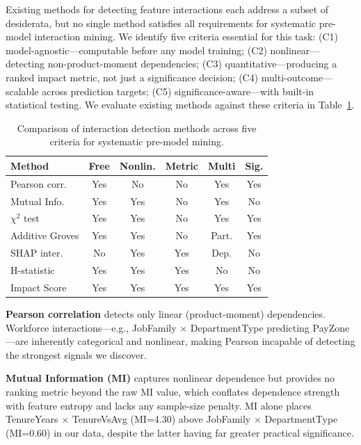 \documentclass[conference]{IEEEtran}
\begin{document}
Existing methods for detecting feature interactions each address a subset of desiderata, but no single method satisfies all requirements for systematic pre-model interaction mining. We identify five criteria essential for this task: (C1) model-agnostic---computable before any model training; (C2) nonlinear---detecting non-product-moment dependencies; (C3) quantitative---producing a ranked impact metric, not just a significance decision; (C4) multi-outcome---scalable across prediction targets; (C5) significance-aware---with built-in statistical testing. We evaluate existing methods against these criteria in Table~\ref{tab:method_comparison}.

\begin{table}[htb]
\centering
\small
\renewcommand{\arraystretch}{1.15}
\caption{Comparison of interaction detection methods across five criteria for systematic pre-model mining.}
\label{tab:method_comparison}
\begin{tabular}{lccccc}
\hline
Method & Free & Nonlin. & Metric & Multi & Sig. \\
\hline
Pearson corr. & Yes & No & No & Yes & Yes \\
Mutual Info. & Yes & Yes & No & Yes & No \\
$\chi^2$ test & Yes & Yes & No & Yes & Yes \\
Additive Groves \cite{sorokina2008detecting} & Yes & Yes & No & Part. & Yes \\
SHAP inter. \cite{lundberg2020shap} & No & Yes & Yes & Dep. & No \\
H-statistic \cite{friedman2008predictive} & Yes & Yes & Yes & No & No \\
Impact Score & Yes & Yes & Yes & Yes & Yes \\
\hline
\end{tabular}
\end{table}

\noindent\textbf{Pearson correlation} detects only linear (product-moment) dependencies. Workforce interactions---e.g., JobFamily $\times$ DepartmentType predicting PayZone---are inherently categorical and nonlinear, making Pearson incapable of detecting the strongest signals we discover.

\textbf{Mutual Information (MI)} captures nonlinear dependence but provides no ranking metric beyond the raw MI value, which conflates dependence strength with feature entropy and lacks any sample-size penalty. MI alone places TenureYears $\times$ TenureVsAvg (MI=4.30) above JobFamily $\times$ DepartmentType (MI=0.60) in our data, despite the latter having far greater practical significance.
\end{document}
